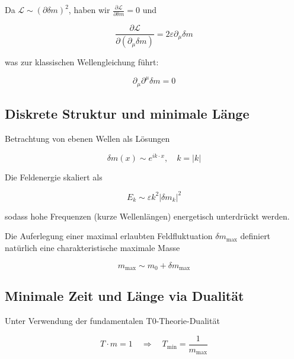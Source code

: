 \documentclass[12pt,a4paper]{article}
\numberwithin{equation}{section}
\begin{document}
	Da $\mathcal{L} \sim (\partial \delta m)^2$, haben wir $\frac{\partial \mathcal{L}}{\partial \delta m} = 0$ und
	
	\begin{equation}
		\frac{\partial \mathcal{L}}{\partial (\partial_\mu \delta m)} = 2 \varepsilon \partial_\mu \delta m
	\end{equation}
	
	was zur klassischen Wellengleichung führt:
	
	\begin{equation}
		\partial_\mu \partial^\mu \delta m = 0
	\end{equation}
	
	\subsection{Diskrete Struktur und minimale Länge}
	
	Betrachtung von ebenen Wellen als Lösungen
	
	\begin{equation}
		\delta m(x) \sim e^{i k \cdot x}, \quad k = |k|
	\end{equation}
	
	Die Feldenergie skaliert als
	
	\begin{equation}
		E_k \sim \varepsilon k^2 |\delta m_k|^2
	\end{equation}
	
	sodass hohe Frequenzen (kurze Wellenlängen) energetisch unterdrückt werden.
	
	Die Auferlegung einer maximal erlaubten Feldfluktuation $\delta m_{\mathrm{max}}$ definiert natürlich eine charakteristische maximale Masse
	
	\begin{equation}
		m_{\mathrm{max}} \sim m_0 + \delta m_{\mathrm{max}}
	\end{equation}
	
	\subsection{Minimale Zeit und Länge via Dualität}
	
	Unter Verwendung der fundamentalen T0-Theorie-Dualität
	
	\begin{equation}
		T \cdot m = 1 \quad \Rightarrow \quad T_{\mathrm{min}} = \frac{1}{m_{\mathrm{max}}}
	\end{equation}
	
\end{document}
